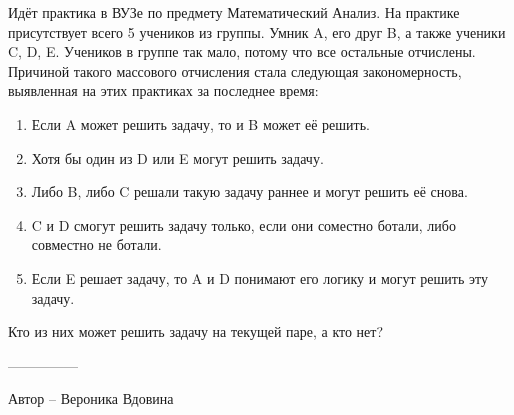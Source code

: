 \question
Идёт практика в ВУЗе по предмету Математический Анализ. На практике присутствует всего 5 учеников из группы. Умник A, его друг B, а также ученики C, D, E. Учеников в группе так мало, потому что все остальные отчислены. Причиной такого массового отчисления стала следующая закономерность, выявленная на этих практиках за последнее время:

\begin{enumerate}
    \item Если A может решить задачу, то и B может её решить.
\item Хотя бы один из D или E могут решить задачу.
\item Либо B, либо C решали такую задачу раннее и могут решить её снова.
\item C и D смогут решить задачу только, если они соместно ботали, либо совместно не ботали.
\item Если E решает задачу, то A и D понимают его логику и могут решить эту задачу.
\end{enumerate}
Кто из них может решить задачу на текущей паре, а кто нет?

---------------

Автор -- Вероника Вдовина
